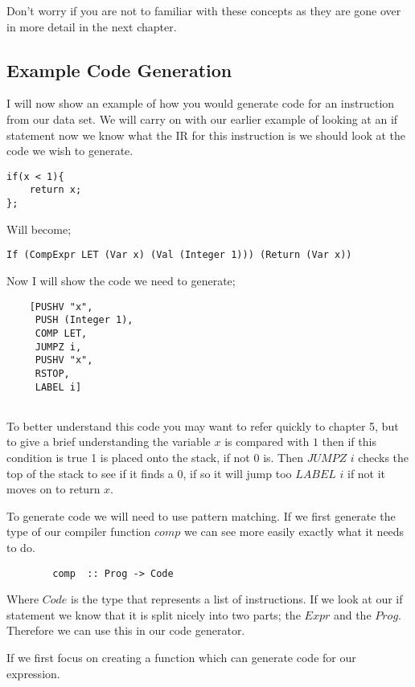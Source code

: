 Don't worry if you are not to familiar with these concepts as they are gone over in more detail in the next chapter.    

 
\subsection{Example Code Generation}

I will now show an example of how you would generate code for an instruction from our data set. We will carry on with our earlier example of looking at an if statement now we know what the IR for this instruction is we should look at the code we wish to generate. 

\begin{lstlisting}
if(x < 1){
	return x;
};
\end{lstlisting}
Will become;

\begin{lstlisting}
If (CompExpr LET (Var x) (Val (Integer 1))) (Return (Var x))
\end{lstlisting}
	
Now I will show the code we need to generate;

\begin{lstlisting}
	[PUSHV "x",         
	 PUSH (Integer 1), 
	 COMP LET,         
	 JUMPZ i,           
	 PUSHV "x",
	 RSTOP,           
	 LABEL i]
	
\end{lstlisting}

To better understand this code you may want to refer quickly to chapter 5, but to give a brief understanding the variable $x$ is compared with $1$ then if this condition is true 1 is placed onto the stack, if not 0 is. Then $JUMPZ$ $i$ checks the top of the stack to see if it finds a 0, if so it will jump too $LABEL$ $i$ if not it moves on to return $x$. 

To generate code we will need to use pattern matching. If we first generate the type of our compiler function $comp$ we can see more easily exactly what it needs to do. 

\begin{lstlisting}
		comp  :: Prog -> Code
\end{lstlisting} 

Where $Code$ is the type that represents a list of instructions. If we look at our if statement we know that it is split nicely into two parts; the $Expr$ and the $Prog$. Therefore we can use this in our code generator. 

If we first focus on creating a function which can generate code for our expression.

